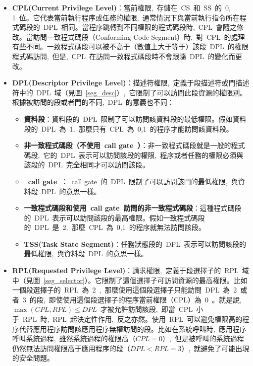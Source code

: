 \begin{itemize}
\item{\textbf{CPL(Current Privilege Level)}}：當前權限,~存儲在~CS~和~SS~的~0, 1~位。它代表當前執行程序或任務的權限,~通常情況下與當前執行指令所在程式碼段的~DPL~相同。當程序跳轉到不同權限的程式碼段時,~CPL~會隨之修改。當訪問一致程式碼段（Conforming Code Segment）時,~對~CPL~的處理有些不同。一致程式碼段可以被不高于（數值上大于等于）該段~DPL~的權限程式碼訪問,~但是,~CPL~在訪問一致程式碼段時不會跟隨~DPL~的變化而更改。

\item{\textbf{DPL(Descriptor Privilege Level)}}：描述符權限,~定義于段描述符或門描述符中的~DPL~域（見圖~\ref{seg_desc}）,~它限制了可以訪問此段資源的權限別。根據被訪問的段或者門的不同,~DPL~的意義也不同：
  \begin{itemize}
  \item{\textbf{資料段}}：資料段的~DPL~限制了可以訪問該資料段的最低權限。假如資料段的~DPL~為~1,~那麼只有~CPL~為~0,1~的程序才能訪問該資料段。
  \item{\textbf{非一致程式碼段（不使用~call gate~）}}：非一致程式碼段就是一般的程式碼段,~它的~DPL~表示可以訪問該段的權限,~程序或者任務的權限必須與該段的~DPL~完全相同才可以訪問該段。
  \item{\textbf{~call gate~}}：~call gate~的~DPL~限制了可以訪問該門的最低權限,~與資料段~DPL~的意思一樣。
  \item{\textbf{一致程式碼段和使用~call gate~訪問的非一致程式碼段}}：這種程式碼段的~DPL~表示可以訪問該段的最高權限。假如一致程式碼段的~DPL~是~2,~那麼~CPL~為~0,1~的程序就無法訪問該段。
  \item{\textbf{TSS(Task State Segment)}}：任務狀態段的~DPL~表示可以訪問該段的最低權限,~與資料段~DPL~的意思一樣。
  \end{itemize}

\item{\textbf{RPL(Requested Privilege Level)}}：請求權限,~定義于段選擇子的~RPL~域中（見圖~\ref{seg_selector}）。它限制了這個選擇子可訪問資源的最高權限。比如一個段選擇子的~RPL~為~2~,~那麼使用這個段選擇子只能訪問~DPL~為~2~或者~3~的段,~即使使用這個段選擇子的程序當前權限（CPL）為~0~。就是說,~$\max{(CPL, RPL)}\le DPL$~才被允許訪問該段,~即當~CPL~小于~RPL~時,~RPL~起決定性作用,~反之亦然。使用~RPL~可以避免權限高的程序代替應用程序訪問該應用程序無權訪問的段。比如在系統呼叫時,~應用程序呼叫系統過程,~雖然系統過程的權限高（$CPL=0$）,~但是被呼叫的系統過程仍然無法訪問權限高于應用程序的段（$DPL<RPL=3$）,~就避免了可能出現的安全問題。
\end{itemize}

